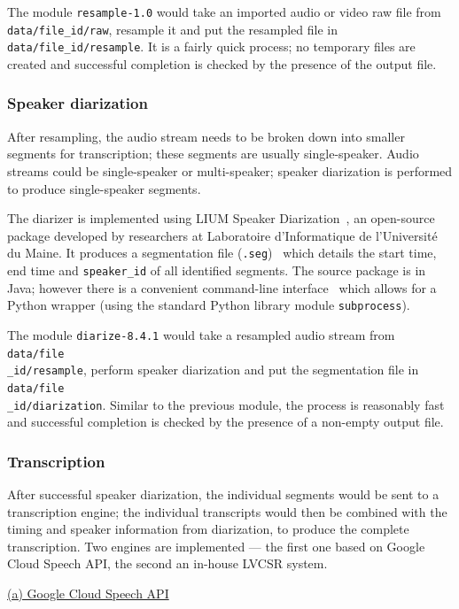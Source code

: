 The module \texttt{resample-1.0} would take an imported audio or video raw file from \texttt{data/file\_id/raw}, resample it and put the resampled file in \texttt{data/file\_id/resample}. It is a fairly quick process; no temporary files are created and successful completion is checked by the presence of the output file.

\subsubsection{Speaker diarization}

After resampling, the audio stream needs to be broken down into smaller segments
for transcription; these segments are usually single-speaker. Audio streams could
be single-speaker or multi-speaker; speaker diarization is performed to produce
single-speaker segments.

The diarizer is implemented using LIUM Speaker Diarization~\cite{lium}, an
open-source package developed by researchers at Laboratoire d'Informatique de
l'Université du Maine. It produces a segmentation file 
(\texttt{.seg})~\cite{lium-seg} which details the start time, end time and
\texttt{speaker\_id} of all identified segments. The source package is in Java;
however there is a convenient command-line interface~\cite{lium} which allows
for a Python wrapper (using the standard Python library module
\texttt{subprocess}).

The module \texttt{diarize-8.4.1} would take a resampled audio stream from
\texttt{data/file\\ \_id/resample}, perform speaker diarization and put the
segmentation file in \texttt{data/file\\ \_id/diarization}. Similar to the
previous module, the process is reasonably fast and successful completion is
checked by the presence of a non-empty output file.

\subsubsection{Transcription}

After successful speaker diarization, the individual segments would be sent
to a transcription engine; the individual transcripts would then be combined
with the timing and speaker information from diarization, to produce the complete
transcription. Two engines are implemented --- the first one based on Google
Cloud Speech API, the second an in-house LVCSR system.

\underline{(a) Google Cloud Speech API}

